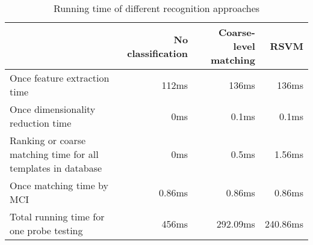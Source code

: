 \begin{table}[htbp]
\centering
\caption{Running time of different recognition approaches}
\begin{tabular}{|p{4.5cm}|r|r|r|}
\hline
& No classification & Coarse-level matching & RSVM \\
\hline
{Once feature extraction time} & 112ms & 136ms & 136ms \\ \hline
{Once dimensionality reduction time} & 0ms   & 0.1ms & 0.1ms \\ \hline
{Ranking or coarse matching time for all templates in database} & 0ms   & 0.5ms & 1.56ms \\ \hline
{Once matching time by MCI} & 0.86ms & 0.86ms & 0.86ms \\ \hline
{Total running time for one probe testing} & 456ms & 292.09ms & 240.86ms \\
\hline
\end{tabular}%
\label{tab:experiment:time}%
\end{table}%

